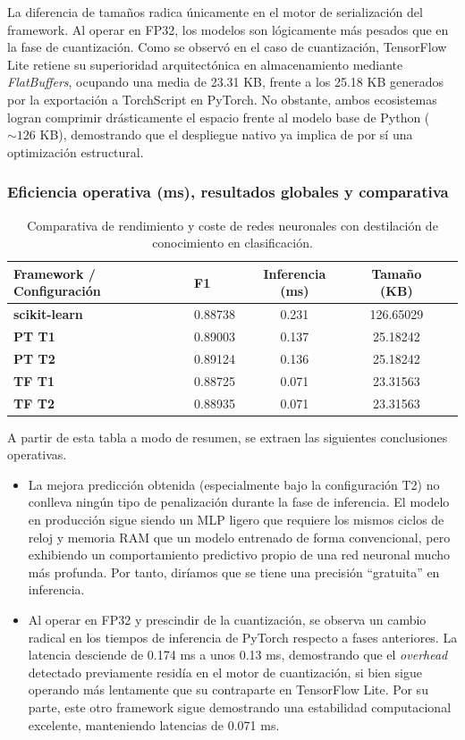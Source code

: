 \documentclass[a4paper,12pt,twoside,final]{book}
\begin{document}
\newpage
La diferencia de tamaños radica únicamente en el motor de serialización del framework. Al operar en FP32, los modelos son
lógicamente más pesados que en la fase de cuantización. Como se observó en el caso de cuantización, TensorFlow Lite
retiene su superioridad arquitectónica en almacenamiento mediante \textit{FlatBuffers}, ocupando una media de 23.31 KB,
frente a los 25.18 KB generados por la exportación a TorchScript en PyTorch. No obstante, ambos ecosistemas logran
comprimir drásticamente el espacio frente al modelo base de Python ($\sim 126$ KB), demostrando que el despliegue nativo
ya implica de por sí una optimización estructural.

\subsubsection{Eficiencia operativa (ms), resultados globales y comparativa}
\begin{table}[htbp]
  \centering
  \begin{tabularx}{\textwidth}{lXccc}
    \hline
    \textbf{Framework / Configuración} & \textbf{F1} & \textbf{Inferencia (ms)} & \textbf{Tamaño (KB)} \\
    \hline
    \textbf{scikit-learn}     & 0.88738 & 0.231 & 126.65029 \\
    \hline
    \textbf{PT T1}            & 0.89003 & 0.137 & 25.18242  \\
    \textbf{PT T2}            & 0.89124 & 0.136 & 25.18242  \\
    \hline
    \textbf{TF T1}            & 0.88725 & 0.071 & 23.31563  \\
    \textbf{TF T2}            & 0.88935 & 0.071 & 23.31563  \\
    \hline
  \end{tabularx}
  \caption{Comparativa de rendimiento y coste de redes neuronales con destilación de conocimiento en clasificación.}
  \label{tab:nn_kd_clas_resumen}
\end{table}
A partir de esta tabla a modo de resumen, se extraen las siguientes conclusiones operativas.
\begin{itemize}
  \item La mejora predicción obtenida (especialmente bajo la configuración T2) no conlleva ningún tipo de penalización
  durante la fase de inferencia. El modelo en producción sigue siendo un MLP ligero que requiere los mismos ciclos de
  reloj y memoria RAM que un modelo entrenado de forma convencional, pero exhibiendo un comportamiento predictivo propio
  de una red neuronal mucho más profunda. Por tanto, diríamos que se tiene una precisión ``gratuita'' en inferencia.
  \item Al operar en FP32 y prescindir de la cuantización, se observa un cambio radical en los tiempos de inferencia de
  PyTorch respecto a fases anteriores. La latencia desciende de 0.174 ms a unos 0.13 ms, demostrando que el
  \textit{overhead} detectado previamente residía en el motor de cuantización, si bien sigue operando más lentamente que
  su contraparte en TensorFlow Lite. Por su parte, este otro framework sigue demostrando una estabilidad computacional
  excelente, manteniendo latencias de 0.071 ms.
\end{itemize}
\end{document}
